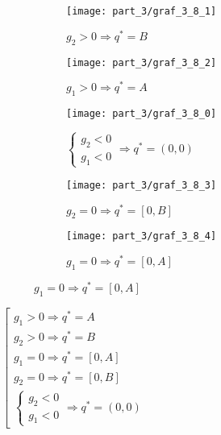 \begin{flushleft}
	\begin{figure}[H]
    	\centering
     	\begin{subfigure}[b]{0.3 \textwidth}
        	\centering
        	\texttt{[image: part\_3/graf\_3\_8\_1]}
        	\caption{$g_2 > 0 \Rightarrow q^*=B$}
     	\end{subfigure}
     	\begin{subfigure}[b]{0.3 \textwidth}
        	\centering
        	\texttt{[image: part\_3/graf\_3\_8\_2]}
        	\caption{$g_1 > 0 \Rightarrow q^*=A$}
     	\end{subfigure}
     	\begin{subfigure}[b]{0.3 \textwidth}
        	\centering
        	\texttt{[image: part\_3/graf\_3\_8\_0]}
        	\caption{$
        	\begin{cases}			
				g_2 < 0 \\
				g_1 < 0
			\end{cases}	\Rightarrow q^*=(0,0)
			$}
     	\end{subfigure}
    	\centering
     	\begin{subfigure}[b]{0.3 \textwidth}
        	\centering
        	\texttt{[image: part\_3/graf\_3\_8\_3]}
        	\caption{$g_2 = 0 \Rightarrow q^*=[0,B]$}
     	\end{subfigure}
     	\begin{subfigure}[b]{0.3 \textwidth}
        	\centering
        	\texttt{[image: part\_3/graf\_3\_8\_4]}
        	\caption{$g_1 = 0 \Rightarrow q^*=[0,A]$}
     	\end{subfigure}
	\end{figure}


	
	\begin{center}
		$\left[
		\begin{gathered}
			g_1 > 0 \Rightarrow q^*=A \\
			g_2 > 0 \Rightarrow q^*=B \\			
			g_1 = 0 \Rightarrow q^*=[0,A] \\
			g_2 = 0 \Rightarrow q^*=[0,B] \\			
			\begin{cases}			
				g_2 < 0 \\
				g_1 < 0
			\end{cases}	\Rightarrow q^*=(0,0)
		\end{gathered}
		\right.$	
	\end{center}



\end{flushleft}
